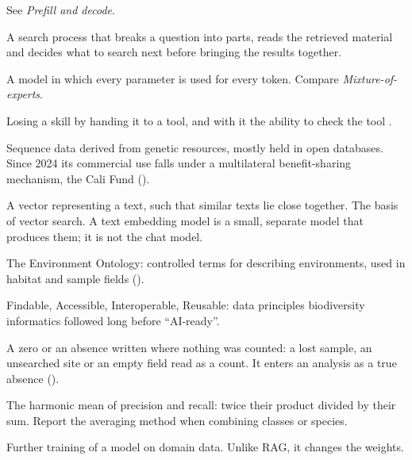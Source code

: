 \begin{description}[itemsep=0.2em]
\item[Decode] See \emph{Prefill and decode}.

\item[Deep research] A search process that breaks a question into parts,
  reads the retrieved material and decides what to search next before
  bringing the results together.

\item[Dense model] A model in which every parameter is used for every token.
  Compare \emph{Mixture-of-experts}.

\item[Deskilling] Losing a skill by handing it to a tool, and with it the
  ability to check the tool \parencite{mammides2026llmecology}.

\item[Digital sequence information (DSI)] Sequence data derived from genetic
  resources, mostly held in open databases. Since 2024 its commercial use
  falls under a multilateral benefit-sharing mechanism, the Cali Fund
  \parencite{cbd2024dsidecision} ().

\item[Embedding] A vector representing a text, such that similar texts lie close
  together. The basis of vector search. A text embedding model is a small,
  separate model that produces them; it is not the chat model.

\item[ENVO] The Environment Ontology: controlled terms for describing
  environments, used in habitat and sample fields ().

\item[FAIR] Findable, Accessible, Interoperable, Reusable: data principles
  biodiversity informatics followed long before ``AI-ready''.

\item[False zero] A zero or an absence written where nothing was counted: a
  lost sample, an unsearched site or an empty field read as a count. It enters
  an analysis as a true absence ().

\item[F1 score] The harmonic mean of precision and recall:
  twice their product divided by their sum. Report the averaging method when
  combining classes or species.

\item[Fine-tuning] Further training of a model on domain data. Unlike RAG, it
  changes the weights.


\end{description}
